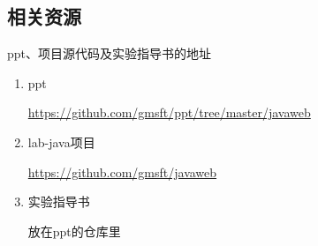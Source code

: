 \documentclass{beamer}
\begin{document}
\subsection{相关资源}
\begin{frame}
\begin{block}{ppt、项目源代码及实验指导书的地址}
\begin{enumerate}
\item
ppt

\url{https://github.com/gmsft/ppt/tree/master/javaweb}
\item
lab-java项目

\url{https://github.com/gmsft/javaweb}

\item
实验指导书

放在ppt的仓库里
\end{enumerate}
\end{block}
\end{frame}



\end{document}
